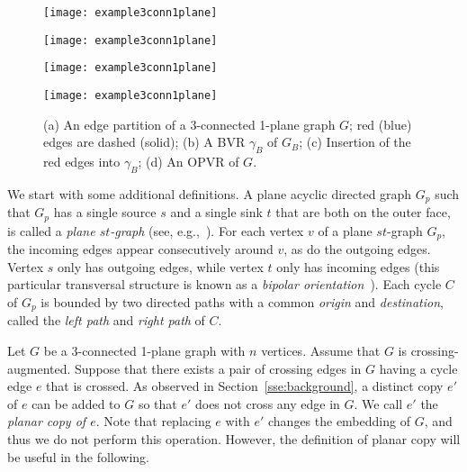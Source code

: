 \documentclass{article}
\newcommand{\opvr}{OPVR\xspace}
\begin{document}
\begin{figure}[tb]
    \centering
    \begin{minipage}[b]{.24\textwidth}
    	\centering
    	\texttt{[image: example3conn1plane]}
    	\subcaption{}\label{fi:example3conn1plane-1}
    \end{minipage}
    \begin{minipage}[b]{.24\textwidth}
    	\centering
    	\texttt{[image: example3conn1plane]}
    	\subcaption{}\label{fi:example3conn1plane-2}
    \end{minipage}
    \begin{minipage}[b]{.24\textwidth}
    	\centering
    	\texttt{[image: example3conn1plane]}
    	\subcaption{}\label{fi:example3conn1plane-3}
    \end{minipage}
    \begin{minipage}[b]{.24\textwidth}
    	\centering
    	\texttt{[image: example3conn1plane]}
    	\subcaption{}\label{fi:example3conn1plane-4}
    \end{minipage}
    \caption{(a) An edge partition of a 3-connected 1-plane graph $G$; red (blue) edges are dashed (solid); (b) A BVR $\gamma_B$ of $G_B$; (c) Insertion of the red edges into $\gamma_B$; (d) An \opvr of $G$.\label{fi:example3conn1plane}}
\end{figure}


We start with some additional definitions. A plane acyclic directed graph $G_p$ such that $G_p$ has a single source $s$ and a single sink $t$ that are both on the outer face, is called a \emph{plane $st$-graph} (see, e.g.,~\cite{DBLP:journals/dcg/RosenstiehlT86,TamassiaTollis86}).  For each vertex $v$ of a plane $st$-graph $G_p$, the incoming edges appear consecutively around $v$, as do the outgoing edges. Vertex $s$ only has outgoing edges, while vertex $t$ only has incoming edges (this particular transversal structure is known as a \emph{bipolar orientation}~\cite{DBLP:journals/dcg/RosenstiehlT86,TamassiaTollis86}). Each cycle $C$ of $G_p$ is bounded by two directed paths with a common \emph{origin} and \emph{destination}, called the \emph{left path} and \emph{right path} of $C$. 

Let $G$ be a 3-connected 1-plane graph with $n$ vertices. Assume that $G$ is crossing-augmented. Suppose that there exists a pair of crossing edges in $G$ having a cycle edge $e$ that is crossed. As observed in Section~\ref{sse:background}, a distinct copy $e'$ of $e$ can be added to $G$ so that $e'$ does not cross any edge in $G$. We call $e'$ the \emph{planar copy of $e$}. Note that replacing $e$ with $e'$ changes the embedding of $G$, and thus we do not perform this operation. However, the definition of planar copy will be useful in the following.    
\end{document}
